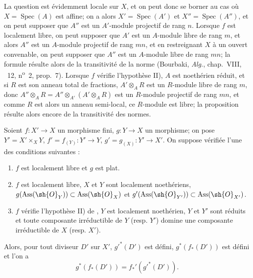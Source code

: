 La question est évidemment locale sur $X$, et on peut donc se borner au cas où $X=\operatorname{Spec}(A)$ est affine;
on a alors $X'=\operatorname{Spec}(A')$ et $X''=\operatorname{Spec}(A'')$, et on peut supposer que $A''$ est un $A'$-module projectif de rang $n$.
Lorsque $f$ est localement libre, on peut supposer que $A'$ est un $A$-module libre de rang $m$, et alors $A''$ est un $A$-module projectif de rang $mn$, et en restreignant $X$ à un ouvert convenable, on peut supposer que $A''$ est un $A$-module libre de rang $mn$;
la formule  résulte alors de la transitivité de la norme (Bourbaki, \emph{Alg.}, chap.~VIII, \textsection~12, n\textsuperscript{o}~2, prop.~7).
Lorsque $f$ vérifie l'hypothèse II), $A$ est noethérien réduit, et si $R$ est son anneau total de fractions, $A'\otimes_A R$ est un $R$-module libre de rang $m$, donc $A''\otimes_A R=A''\otimes_{A'}(A'\otimes_A R)$ est un $R$-module projectif de rang $mn$, et comme $R$ est alors un anneau semi-local, ce $R$-module est libre;
la proposition résulte alors encore de la transitivité des normes.

\begin{proposition}[21.5.8]
\label{IV.21.5.8}
Soient $f:X'\to X$ un morphisme fini, $g:Y\to X$ un morphisme;
on pose $Y'=X'\times_XY$, $f'=f_{(Y)}:Y'\to Y$, $g'=g_{(X)}:Y'\to X'$.
On suppose vérifiée l'une des conditions suivantes :
\begin{enumerate}[label=\textup{(\roman*)}]
  \item $f$ est localement libre et $g$ est plat.
  \item $f$ est localement libre, $X$ et $Y$ sont localement noethériens, $g(\operatorname{Ass}(\sh{O}_Y))\subset\operatorname{Ass}(\sh{O}_X)$ et $g'(\operatorname{Ass}(\sh{O}_{Y'}))\subset\operatorname{Ass}(\sh{O}_{X'})$.
  \item $f$ vérifie l'hypothèse \textup{II)} de , $Y$ est localement noethérien, $Y$ et $Y'$ sont réduits et toute composante irréductible de $Y$ \textup{(resp.} $Y'$\textup{)} domine une composante irréductible de $X$ \textup{(resp.} $X'$\textup{)}.
\end{enumerate}

Alors, pour tout diviseur $D'$ sur $X'$, $g'^*(D')$ est défini, $g^*(f_*(D'))$ est défini et l'on a
\[
\label{IV.21.5.8.1}
  g^*(f_*(D'))=f_*'(g'^*(D')).
  \tag{21.5.8.1}
\]
\end{proposition}

